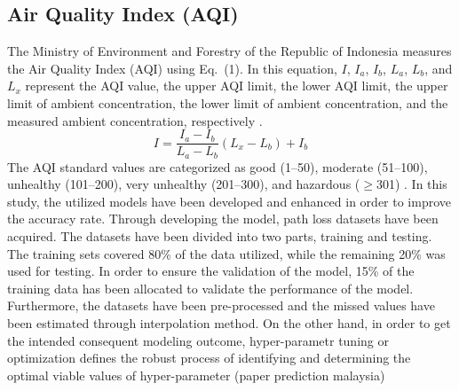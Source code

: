 \documentclass[review,12pt]{elsarticle}
\begin{document}
\subsection{Air Quality Index (AQI)}
The Ministry of Environment and Forestry of the Republic of Indonesia measures the Air Quality Index (AQI) using Eq.~(1). In this equation, $I$, $I_a$, $I_b$, $L_a$, $L_b$, and $L_x$ represent the AQI value, the upper AQI limit, the lower AQI limit, the upper limit of ambient concentration, the lower limit of ambient concentration, and the measured ambient concentration, respectively \cite{KLHK2020}.
\begin{equation}
I = \frac{I_a - I_b}{L_a - L_b} \left( L_x - L_b \right) + I_b
\tag{1}
\end{equation}
The AQI standard values are categorized as good (1--50), moderate (51--100), unhealthy (101--200), very unhealthy (201--300), and hazardous ($\geq$301) \cite{KLHK}.
In this study, the utilized models have been developed and enhanced in order to improve the accuracy rate. Through developing the model, path loss datasets have been acquired. The datasets have been divided into two parts, training and testing. The training sets covered 80\% of the data utilized, while the remaining 20\% was used for testing. In order to ensure the validation of the model, 15\% of the training data has been allocated to validate the performance of the model. Furthermore, the datasets have been pre-processed and the missed values have been estimated through interpolation method. On the other hand, in order to get the intended consequent modeling outcome, hyper-parametr tuning or optimization defines the robust process of identifying and determining the optimal viable values of hyper-parameter (paper prediction malaysia)
\end{document}
